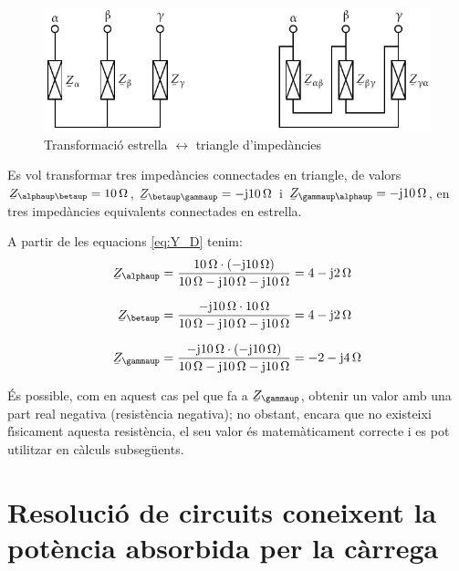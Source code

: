 \begin{figure}[htb]
    \centering
    \includegraphics{Imatges/Cap-CalcBas-YD.pdf}
\caption{Transformaci\'{o} estrella $\leftrightarrow$ triangle
d'imped\`{a}ncies} \label{pic:Y_D}
\end{figure}

\begin{exemple}
Es vol transformar tres imped\`{a}ncies connectades en triangle, de
valors $ \cmplx{Z}_{\alphaup\betaup}=10\unit{\ohm}$,
$\cmplx{Z}_{\betaup\gammaup}=-\ju10\unit{\ohm}$ i
$\cmplx{Z}_{\gammaup\alphaup}=-\ju10\unit{\ohm}$, en tres imped\`{a}ncies
equivalents connectades en estrella.

A partir de les equacions \eqref{eq:Y_D}  tenim:
\begin{align*}
   \cmplx{Z}_{\alphaup} & = \frac{10\unit{\ohm}\cdot(-\ju10\unit{\ohm})}{10\unit{\ohm} - \ju10\unit{\ohm} - \ju10\unit{\ohm}} = 4 - \ju 2\unit{\ohm} \\[1.5ex]
   \cmplx{Z}_{\betaup} & = \frac{-\ju10\unit{\ohm}\cdot10\unit{\ohm}}{10\unit{\ohm} - \ju10\unit{\ohm} - \ju10\unit{\ohm}} = 4 - \ju 2\unit{\ohm} \\[1.5ex]
\cmplx{Z}_{\gammaup} &=
\frac{-\ju10\unit{\ohm}\cdot(-\ju10\unit{\ohm})}{10\unit{\ohm} -
\ju10\unit{\ohm} - \ju10\unit{\ohm}} = -2 - \ju 4\unit{\ohm}
\end{align*}

\'{E}s possible, com en aquest cas pel que fa a $\cmplx{Z}_{\gammaup}$,
obtenir un valor amb una part real negativa (resist\`{e}ncia negativa);
no obstant, encara que no existeixi f\'{\i}sicament aquesta resist\`{e}ncia,
el seu valor \'{e}s matem\`{a}ticament correcte i es pot utilitzar en
c\`{a}lculs subseg\"{u}ents.
\end{exemple}


\section{Resoluci\'{o} de circuits coneixent la pot\`{e}ncia absorbida per la
c\`{a}rrega}\label{sec:EZS}

